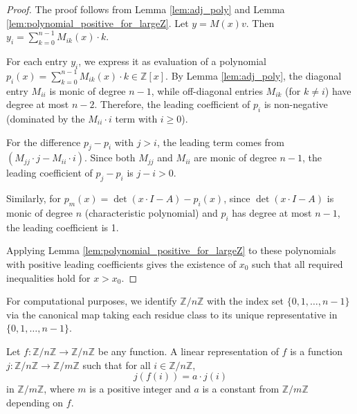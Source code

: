 \begin{proof}
The proof follows from Lemma \ref{lem:adj_poly} and Lemma \ref{lem:polynomial_positive_for_largeZ}.
Let $y = M(x)v$. Then $y_i = \sum_{k=0}^{n-1} M_{ik}(x) \cdot k$.

For each entry $y_i$, we express it as evaluation of a polynomial $p_i(x) = \sum_{k=0}^{n-1} M_{ik}(x) \cdot k \in \mathbb{Z}[x]$.
By Lemma \ref{lem:adj_poly}, the diagonal entry $M_{ii}$ is monic of degree $n-1$, while off-diagonal entries $M_{ik}$ (for $k \neq i$) have degree at most $n-2$.
Therefore, the leading coefficient of $p_i$ is non-negative (dominated by the $M_{ii} \cdot i$ term with $i \geq 0$).

For the difference $p_j - p_i$ with $j > i$, the leading term comes from $(M_{jj} \cdot j - M_{ii} \cdot i)$. Since both $M_{jj}$ and $M_{ii}$ are monic of degree $n-1$, the leading coefficient of $p_j - p_i$ is $j - i > 0$.

Similarly, for $p_m(x) = \det(x\cdot I - A) - p_i(x)$, since $\det(x\cdot I - A)$ is monic of degree $n$ (characteristic polynomial) and $p_i$ has degree at most $n-1$, the leading coefficient is 1.

Applying Lemma \ref{lem:polynomial_positive_for_largeZ} to these polynomials with positive leading coefficients gives the existence of $x_0$ such that all required inequalities hold for $x > x_0$.
\end{proof}

\begin{definition}
\label{def:zmodToFin}
\leanok
For computational purposes, we identify $\mathbb{Z}/n\mathbb{Z}$ with the index set $\{0,1,\ldots,n-1\}$ via the canonical map 
taking each residue class to its unique representative in $\{0,1,\ldots,n-1\}$.
\end{definition}

\begin{definition}
\label{def:linear_representation}
\leanok
Let $f: \mathbb{Z}/n\mathbb{Z} \to \mathbb{Z}/n\mathbb{Z}$ be any function. A linear representation of $f$ is a function $j: \mathbb{Z}/n\mathbb{Z} \to \mathbb{Z}/m\mathbb{Z}$ such that for all $i\in \mathbb{Z}/n\mathbb{Z}$,
$$j(f(i)) = a \cdot j(i)$$
in $\mathbb{Z}/m\mathbb{Z}$, where $m$ is a positive integer and $a$ is a constant from $\mathbb{Z}/m\mathbb{Z}$ depending on $f$.
\end{definition}

